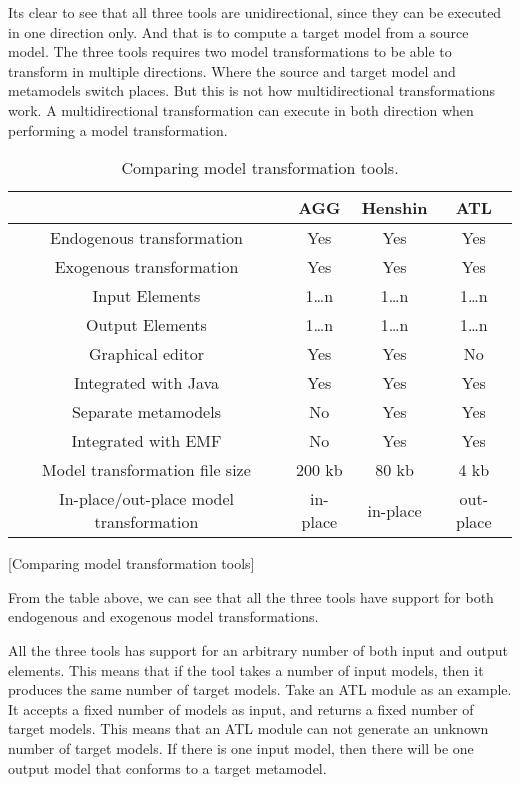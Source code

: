Its clear to see that all three tools are unidirectional, since they can be
executed in one direction only. And that is to compute a target model from a
source model. The three tools requires two model transformations to be able to
transform in multiple directions. Where the source and target model and
metamodels switch places. But this is not how multidirectional transformations
work. A multidirectional transformation can execute in both direction when
performing a model transformation.

\begin{table}[ht]
\centering
\begin{tabular}{| c | c | c | c |}
\hline
 & AGG & Henshin & ATL \\
\hline
Endogenous transformation & \cellcolor{green!25}Yes &
\cellcolor{green!25}Yes & \cellcolor{green!25}Yes \\

Exogenous transformation & \cellcolor{green!25}Yes &
\cellcolor{green!25}Yes & \cellcolor{green!25}Yes \\

Input Elements & 1\ldots n & 1\ldots n & 1\ldots n\\
Output Elements & 1\ldots n & 1\ldots n & 1\ldots n\\
Graphical editor &\cellcolor{green!25}Yes &
\cellcolor{green!25}Yes &\cellcolor{red!25}No  \\
Integrated with Java & \cellcolor{green!25}Yes &
\cellcolor{green!25}Yes & \cellcolor{green!25}Yes \\
Separate metamodels & \cellcolor{red!25}No &
\cellcolor{green!25}Yes & \cellcolor{green!25}Yes \\
Integrated with EMF & \cellcolor{red!25}No &
\cellcolor{green!25}Yes & \cellcolor{green!25}Yes \\
Model transformation file size &200 kb &80 kb &4 kb \\
In-place/out-place model transformation &in-place &
in-place &out-place \\
\hline

\end{tabular}
[Comparing model transformation tools]
\caption{Comparing model transformation tools.}
\end{table}

\newpage

From the table above, we can see that all the three tools have support
for both endogenous and exogenous model transformations. 

All the three tools has support for an arbitrary number of both input and
output elements. This means that if the tool takes a number of input models, then it
produces the same number of target models. Take an ATL module as an example. It
accepts a fixed number of models as input, and returns a fixed number of target
models. This means that an ATL module can not generate an unknown number of
target models. If there is one input model, then there will be one output model
that conforms to a target metamodel.

